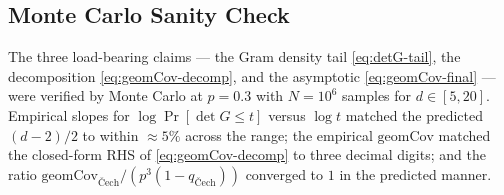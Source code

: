 \documentclass[reqno,12pt]{amsart}
\newcommand{\geomCov}{\mathrm{geomCov}}
\theoremstyle{plain}
\theoremstyle{definition}
\theoremstyle{remark}
\begin{document}
\subsection{Monte Carlo Sanity Check}\label{app:wishart-mc}

The three load-bearing claims --- the Gram density tail \eqref{eq:detG-tail},
the decomposition \eqref{eq:geomCov-decomp}, and the asymptotic
\eqref{eq:geomCov-final} --- were verified by Monte Carlo at $p = 0.3$ with
$N = 10^6$ samples for $d \in [5, 20]$. Empirical slopes for
$\log \Pr[\det G \le t]$ versus $\log t$ matched the predicted $(d-2)/2$
to within $\approx 5\%$ across the range; the empirical $\geomCov$ matched the
closed-form RHS of \eqref{eq:geomCov-decomp} to three decimal digits; and the
ratio $\geomCov_{\text{\v{C}ech}} / (p^3 (1 - q_{\text{\v{C}ech}}))$ converged
to $1$ in the predicted manner.



\end{document}
